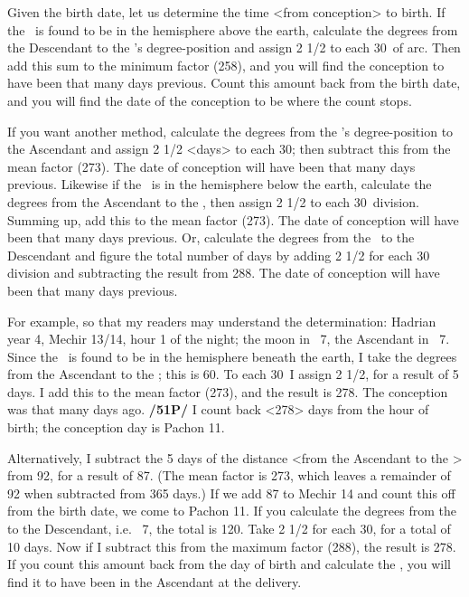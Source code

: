 Given the birth date, let us determine the time <from conception> to birth. If the \Moon\, is found to be in the hemisphere above the earth, calculate the degrees from the Descendant to the \Moon’s degree-position and assign 2 1/2 to each 30\deg\, of arc. Then add this sum to the minimum factor (258), and you will find the conception to have been that many days previous. Count this amount back from the birth date, and you will find the date of the conception to be where the count stops.

If you want another method, calculate the degrees from the \Moon’s degree-position to the Ascendant and assign 2 1/2 <days> to each 30\deg; then subtract this from the mean factor (273). The date of conception will have been that many days previous. Likewise if the \Moon\, is in the hemisphere below the earth, calculate the degrees from the Ascendant to the \Moon, then assign 2 1/2 to each 30\deg\, division. Summing up, add this to the mean factor (273). The date of conception will have been that many days previous. Or, calculate the degrees from the \Moon\, to the Descendant and figure the total number of days by adding 2 1/2 for each 30\deg\, division and subtracting the result from 288. The date of conception will have been that many days previous.

For example, so that my readers may understand the determination: Hadrian year 4, Mechir 13/14, hour 1 of the night; the moon in \Scorpio\, 7\deg, the Ascendant in \Virgo\, 7\deg. Since the \Moon\, is found to be in
the hemisphere beneath the earth, I take the degrees from the Ascendant to the \Moon; this is 60\deg. To each 30\deg\, I assign 2 1/2, for a result of 5 days. I add this to the mean factor (273), and the result is 278. The conception was that many days ago. \textbf{/51P/} I count back <278> days from the hour of birth; the conception day is Pachon 11.

Alternatively, I subtract the 5 days of the distance <from the Ascendant to the \Moon> from 92, for a result of 87. (The mean factor is 273, which leaves a remainder of 92 when subtracted from 365 days.) If we add 87 to Mechir 14 and count this off from the birth date, we come to Pachon 11. If you calculate the degrees from the \Moon\, to the Descendant, i.e. \Pisces\, 7\deg, the total is 120\deg. Take 2
1/2 for each 30\deg, for a total of 10 days. Now if I subtract this from the maximum factor (288), the result is 278. If you count this amount back from the day of birth and calculate the \Moon, you will find it to have been in the Ascendant at the delivery.

